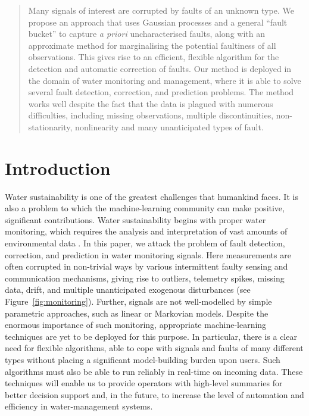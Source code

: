 \documentclass{article}
\begin{document}

\begin{abstract}
  Many signals of interest are corrupted by faults of an unknown
type. We propose an approach that uses Gaussian processes and a
general ``fault bucket'' to capture \textit{a priori} uncharacterised
faults, along with an approximate method for marginalising the
potential faultiness of all observations. This gives rise to an
efficient, flexible algorithm for the detection and automatic
correction of faults. Our method is deployed in the domain of water
monitoring and management, where it is able to solve several fault
detection, correction, and prediction problems. The method works well
despite the fact that the data is plagued with numerous difficulties,
including missing observations, multiple discontinuities,
non-stationarity, nonlinearity and many unanticipated types of fault.
\end{abstract}

\section{Introduction}

Water sustainability is one of the greatest challenges that humankind
faces. It is also a problem to which the machine-learning community
can make positive, significant contributions. Water sustainability
begins with proper water monitoring, which requires the analysis and
interpretation of vast amounts of environmental data
\citep{wagner2006guidelines}. In this paper, we attack the problem of
fault detection, correction, and prediction in water monitoring
signals.  Here measurements are often corrupted in non-trivial ways by
various intermittent faulty sensing and communication mechanisms,
giving rise to outliers, telemetry spikes, missing data, drift, and
multiple unanticipated exogenous disturbances (see
Figure~\ref{fig:monitoring}).  Further, signals are not well-modelled
by simple parametric approaches, such as linear or Markovian
models. Despite the enormous importance of such monitoring,
appropriate machine-learning techniques are yet to be deployed for
this purpose. In particular, there is a clear need for flexible
algorithms, able to cope with signals and faults of many different
types without placing a significant model-building burden upon
users. Such algorithms must also be able to run reliably in real-time
on incoming data.
These techniques will enable us to provide operators with high-level
summaries for better decision support and, in the future, to increase
the level of automation and efficiency in water-management systems.
\end{document}
